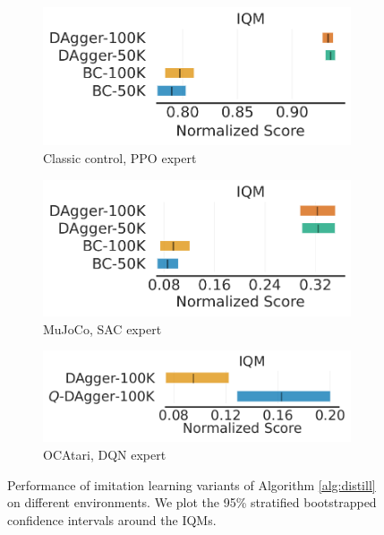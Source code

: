 \begin{figure}[ht]
\centering
\begin{subfigure}{.33\textwidth}
  \centering
  \includegraphics[width=\linewidth]{images/images_part3/ppo_expert_classic_control.pdf}
  \caption{Classic control, PPO expert}
  \label{fig:ppo_classic}
\end{subfigure}%
\begin{subfigure}{.33\textwidth}
  \centering
  \includegraphics[width=\linewidth]{images/images_part3/sac_expert_mujoco.pdf}
  \caption{MuJoCo, SAC expert}
  \label{fig:sac_mujoco}
\end{subfigure}
\begin{subfigure}{.33\textwidth}
  \centering
  \includegraphics[width=\linewidth]{images/images_part3/dqn_expert_atari.pdf}
  \caption{OCAtari, DQN expert}
  \label{fig:dqn_atari}
\end{subfigure}%
\caption{Performance of imitation learning variants of Algorithm \ref{alg:distill} on different environments. We plot the 95\% stratified bootstrapped confidence intervals around the IQMs.}
\label{fig:performance_comparison}
\end{figure}

